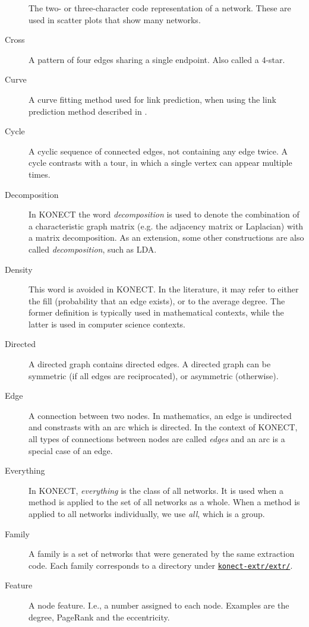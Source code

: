 \documentclass{article}
\begin{document}
\begin{description}
    The two- or three-character code representation of a network.  These
    are used in scatter plots that show many networks.  
  \item[Cross]
    A pattern of four edges sharing a single endpoint.  Also called a
    4-star.  
  \item[Curve]
    A curve fitting method used for link prediction, when using the link
    prediction method described
    in \citep{kunegis:spectral-transformation}.
  \item[Cycle] 
    A cyclic sequence of connected edges, not containing any edge twice.
    A cycle contrasts with a tour, in which a single vertex can appear
    multiple times.  
  \item[Decomposition] In KONECT the word \emph{decomposition} is used
    to denote the combination of a characteristic graph matrix (e.g. the
    adjacency matrix or Laplacian) with a matrix decomposition.  As an
    extension, some other constructions are also called
    \emph{decomposition}, such as LDA.
  \item[Density] This word is avoided in KONECT.  In the literature, it
    may refer to either the fill (probability that an edge exists), or to
    the average degree.  The former definition is typically used in mathematical
    contexts, while the latter is used in computer science contexts.
  \item[Directed] A directed graph contains directed edges.  A directed
    graph can be symmetric (if all edges are reciprocated), or
    asymmetric (otherwise). 
  \item[Edge] A connection between two nodes.  In mathematics, an edge
    is undirected and constrasts with an arc which is directed.  In the
    context of KONECT, all types of connections between nodes are called
    \emph{edges} and an arc is a special case of an edge. 
  \item[Everything] In KONECT, \emph{everything} is the class of all
    networks.  It is used when a method is applied to the set of all
    networks as a whole.  When a method is applied to all networks
    individually, we use \emph{all}, which is a group. 
  \item[Family] A family is a set of networks that were generated by the
    same extraction code.  Each family corresponds to a directory under \href{https://github.com/kunegis/konect-extr/tree/master/extr}{\texttt{konect-extr/extr/}}.
  \item[Feature] A node feature. I.e., a number assigned to each node.
    Examples are the degree, PageRank and the eccentricity. 

\end{description}
\end{document}
